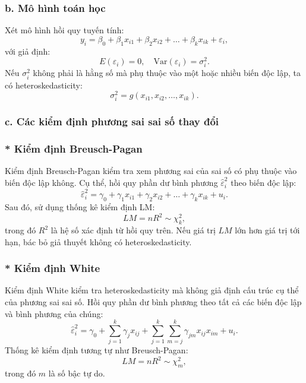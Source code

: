 \subsubsection{b. Mô hình toán học}
Xét mô hình hồi quy tuyến tính:
\begin{equation}
    y_i = \beta_0 + \beta_1 x_{i1} + \beta_2 x_{i2} + \dots + \beta_k x_{ik} + \varepsilon_i,
\end{equation}
với giả định:
\begin{equation}
    E(\varepsilon_i) = 0, \quad \text{Var}(\varepsilon_i) = \sigma_i^2.
\end{equation}
Nếu $\sigma_i^2$ không phải là hằng số mà phụ thuộc vào một hoặc nhiều biến độc lập, ta có heteroskedasticity:
\begin{equation}
    \sigma_i^2 = g(x_{i1}, x_{i2}, \dots, x_{ik}).
\end{equation}

\subsubsection{c. Các kiểm định phương sai sai số thay đổi}
\subsubsection{* Kiểm định Breusch-Pagan}
Kiểm định Breusch-Pagan kiểm tra xem phương sai của sai số có phụ thuộc vào biến độc lập không. Cụ thể, hồi quy phần dư bình phương $\hat{\varepsilon}_i^2$ theo biến độc lập:
\begin{equation}
    \hat{\varepsilon}_i^2 = \gamma_0 + \gamma_1 x_{i1} + \gamma_2 x_{i2} + \dots + \gamma_k x_{ik} + u_i.
\end{equation}
Sau đó, sử dụng thống kê kiểm định LM:
\begin{equation}
    LM = n R^2 \sim \chi^2_k,
\end{equation}
trong đó $R^2$ là hệ số xác định từ hồi quy trên. Nếu giá trị $LM$ lớn hơn giá trị tới hạn, bác bỏ giả thuyết không có heteroskedasticity.

\subsubsection{* Kiểm định White}
Kiểm định White kiểm tra heteroskedasticity mà không giả định cấu trúc cụ thể của phương sai sai số. Hồi quy phần dư bình phương theo tất cả các biến độc lập và bình phương của chúng:
\begin{equation}
    \hat{\varepsilon}_i^2 = \gamma_0 + \sum_{j=1}^{k} \gamma_j x_{ij} + \sum_{j=1}^{k} \sum_{m=j}^{k} \gamma_{jm} x_{ij} x_{im} + u_i.
\end{equation}
Thống kê kiểm định tương tự như Breusch-Pagan:
\begin{equation}
    LM = n R^2 \sim \chi^2_m,
\end{equation}
trong đó $m$ là số bậc tự do.

